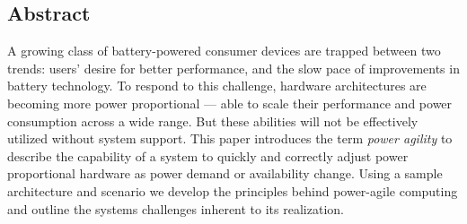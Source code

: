 \subsection*{Abstract}

A growing class of battery-powered consumer devices are trapped between two
trends: users' desire for better performance, and the slow pace of
improvements in battery technology. To respond to this challenge, hardware
architectures are becoming more power proportional --- able to scale their
performance and power consumption across a wide range. But these abilities
will not be effectively utilized without system support. This paper
introduces the term \textit{power agility} to describe the capability of a
system to quickly and correctly adjust power proportional hardware as power
demand or availability change. Using a sample architecture and scenario we
develop the principles behind power-agile computing and outline the systems
challenges inherent to its realization.
